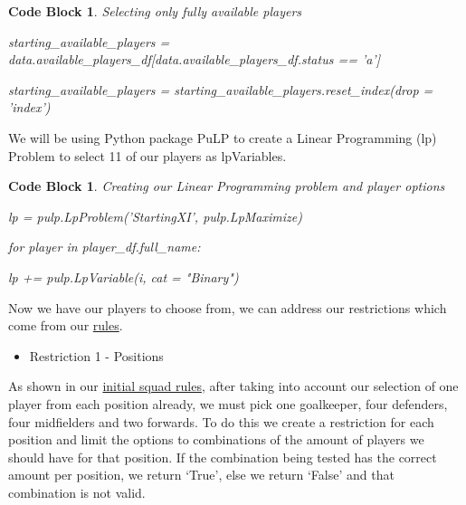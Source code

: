 \documentclass[12pt, a4paper, oneside]{book}
\newtheorem{codeblock}[theorem]{Code Block}
\numberwithin{equation}{section}
\begin{document}
\begin{codeblock}
  Selecting only fully available players

  starting\_available\_players = data.available\_players\_df[data.available\_players\_df.status == 'a']
  
  starting\_available\_players = starting\_available\_players.reset\_index(drop = 'index')
\end{codeblock}

We will be using Python package PuLP \cite{PuLP} to create a Linear Programming (lp) Problem to select 11 of our players as lpVariables.

\begin{codeblock}
  Creating our Linear Programming problem and player options

  lp = pulp.LpProblem('StartingXI', pulp.LpMaximize)

  for player in player\_df.full\_name:

  \hspace{\parindent}lp += pulp.LpVariable(i, cat = "Binary")
\end{codeblock}

Now we have our players to choose from, we can address our restrictions which come from our \hyperref[sec:2.3]{rules}.

\vspace{0.5cm}

\begin{itemize}
  \item Restriction 1 - Positions
\end{itemize}

As shown in our \hyperref[sec:2.3.1]{initial squad rules}, after taking into account our selection of one player from each position already, we must pick one goalkeeper, four defenders, four midfielders and two forwards. To do this we create a restriction for each position and limit the options to combinations of the amount of players we should have for that position. If the combination being tested has the correct amount per position, we return `True', else we return `False' and that combination is not valid.
\end{document}
